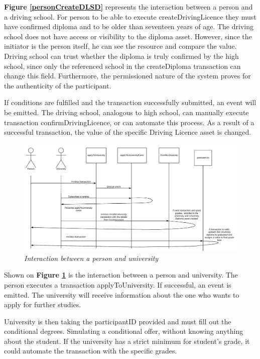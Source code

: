 \documentclass[a4paper,11pt]{report}
\begin{document}
\textbf{Figure \ref{personCreateDLSD}} represents the interaction between a person and a driving school. For person to be able to execute createDrivingLicence they must have confirmed diploma and to be older than seventeen years of age. The driving school does not have access or visibility to the diploma asset. However, since the initiator is the person itself, he can see the resource and compare the value. Driving school can trust whether the diploma is truly confirmed by the high school, since only the referenced school in the createDiploma transaction can change this field. Furthermore, the permissioned nature of the system proves for the authenticity of the participant.  

If conditions are fulfilled and the transaction successfully submitted, an event will be emitted. The driving school, analogous to high school, can manually execute transaction confirmDrivingLicence, or can automate this process. As a result of a successful transaction, the value of the specific Driving Licence asset is changed.   


\begin{figure}[h]
\centering
  \includegraphics[width=16cm]{personToUni.png}
  \caption{\textit{Interaction between a person and university}}
  \label{personToUni}
\end{figure}

Shown on \textbf{Figure \ref{personToUni}} is the interaction between a person and university. The person executes a transaction applyToUniversity. If successful, an event is emitted. The university will receive information about the one who wants to apply for further studies.  

University is then taking the participantID provided and must fill out the conditional degrees. Simulating a conditional offer, without knowing anything about the student. If the university has a strict minimum for student's grade, it could automate the transaction with the specific grades. 
\end{document}
